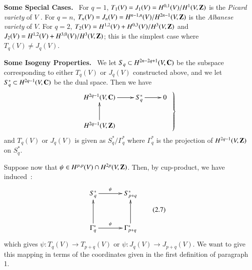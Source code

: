 \noindent
{\bf Some Special Cases.}~ For $q=1$, $T_{1}(V)=J_{1}(V)=H^{0,1}(V)/H^{1}(V,\mathbf{Z})$ is the {\em Picard variety} of $V$ \cite{art08-key22}. For $q=n$, $T_{n}(V)=J_{n}(V)=H^{n-1,n}(V)\break /H^{2n-1}(V,\bfZ)$ is the {\em Albanese variety} \cite{art08-key3} of $V$. For $q=2$, $T_{2}(V)=H^{1,2}(V)+H^{0,3}(V)/H^{3}(V,\mathbf{Z})$ and $J_{2}(V)=H^{1,2}(V)+H^{3,0}(V)/H^{3}(V,\mathbf{Z})$; this is the simplest case where $T_{q}(V)\neq J_{q}(V)$.

\medskip
\noindent
{\bf Some Isogeny Properties.}~ We let $S_{q}\subset H^{2n-2q+1}(V,\mathbf{C})$ be the subspace corresponding to either $T_{q}(V)$ or $J_{q}(V)$ constructed above, and we let $S^{*}_{q}\subset H^{2q-1}(V,\mathbf{C})$ be the dual space. Then we have 
\[
\left.
\begin{array}{c}
\xymatrix{
H^{2q-1}(V,\bfC)\ar[r] & S^{*}_{q}\ar[r] & 0\\
H^{2q-1}(V,\bfZ)\ar[u] & &}
\end{array}\right\}
\]\pageoriginale
and $T_{q}(V)$ or $J_{q}(V)$ is given as $S^{*}_{q}/\Gamma^{*}_{q}$ where $\Gamma^{*}_{q}$ is the projection of $H^{2q-1}(V,\mathbf{Z})$ on $S^{*}_{q}$.

Suppose now that $\psi\in H^{p,p}(V)\cap H^{2p}(V,\mathbf{Z})$. Then, by cup-product, we have induced~:
\begin{equation*}
\vcenter{
\xymatrix@=1.2cm{
S^{*}_{q}\ar[r]^-{\psi} & S^{*}_{p+q}\\
\Gamma^{*}_{q}\ar[r]^-{\psi}\ar[u] & \Gamma^{*}_{p+q}\ar[u]
}}\tag{2.7}\label{art08-sec2-eq2.7}
\end{equation*}
which gives $\psi:T_{q}(V)\to T_{p+q}(V)$ or $\psi:J_{q}(V)\to J_{p+q}(V)$. We want to give this mapping in terms of the coordinates given in the first definition of paragraph 1.

